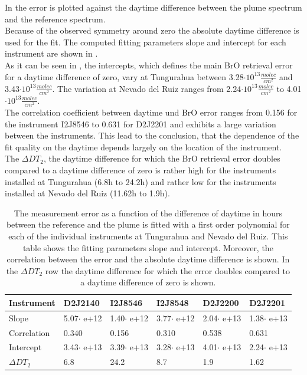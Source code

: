 In  the  error is plotted against the daytime difference between the plume spectrum and the reference spectrum.  \\
Because of the observed symmetry around zero the absolute daytime difference is used for the fit. The computed fitting parameters slope and intercept for each instrument are shown in . \\
%
As it can be seen in , the intercepts, which defines the main BrO retrieval error for a daytime difference of zero, vary at Tungurahua between 3.28$\cdot10^{13}\frac{molec}{cm^2}$ and 3.43$\cdot10^{13}\frac{molec}{cm^2}$. The variation at Nevado del Ruiz ranges from  2.24$\cdot10^{13}\frac{molec}{cm^2}$ to 4.01$\cdot10^{13}\frac{molec}{cm^2}$. \\
The correlation coefficient between daytime und BrO error 
ranges from 0.156 for the instrument I2J8546 to  0.631 for D2J2201 and exhibits a large variation between the instruments. This lead to the conclusion, that the dependence of the fit quality on the daytime depends largely on the location of the instrument.\\
The $\Delta DT_{2}$, the daytime difference for which the BrO retrieval error doubles compared to a daytime difference of zero is rather high for the instruments installed at Tungurahua (6.8h to 24.2h) and rather low for the instruments installed at Nevado del Ruiz (11.62h to 1.9h).

\begin{table}[h]
	\centering
	\begin{tabular}{|p{2cm}|p{2.15cm}|p{2.15cm}|p{2.15cm}|p{2.15cm}|p{2.15cm}|}
		Instrument	&D2J2140&I2J8546& I2J8548&D2J2200&D2J2201\\
		\toprule
		Slope&5.07$\cdot$ e+12&1.40$\cdot$ e+12 &3.77$\cdot$ e+12 &2.04$\cdot$ e+13& 1.38$\cdot$ e+13\\
		\midrule
		Correlation&
		0.340&
		0.156&
		0.310&
		0.538&
		0.631\\
		\midrule
		Intercept& 3.43$\cdot$ e+13&3.39$\cdot$ e+13&3.28$\cdot$ e+13&  4.01$\cdot$ e+13&  2.24$\cdot$ e+13\\
		\midrule
		$\Delta DT_{2}$&6.8&24.2&8.7&1.9&1.62\\
		\bottomrule
	\end{tabular}
	\label{tab:dtcalc}
	\caption{The  measurement error as a function of the difference of daytime in hours between the reference and the plume is fitted with a first order polynomial for each of the individual instruments at Tungurahua and Nevado del Ruiz. This table shows the fitting parameters slope and intercept. Moreover, the correlation between the  error and the absolute daytime difference is shown. In the $\Delta DT_{2}$ row the daytime difference for which the error doubles compared to a daytime difference of zero is shown.}
\end{table}

